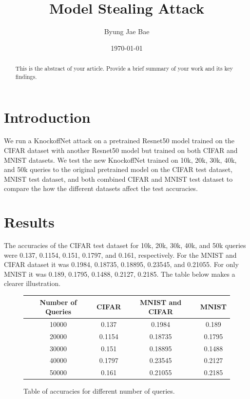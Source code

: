 \documentclass{article}
\title{Model Stealing Attack}
\author{Byung Jae Bae}
\date{\today}
\begin{document}
\maketitle

\begin{abstract}
    This is the abstract of your article. Provide a brief summary of your work and its key findings.
\end{abstract}

\section{Introduction}
We run a KnockoffNet attack on a pretrained Resnet50 model trained on the CIFAR dataset with another Resnet50 model but trained on both 
CIFAR and MNIST datasets. We test the new KnockoffNet trained on 10k, 20k, 30k, 40k, and 50k queries to the original pretrained model on the 
CIFAR test dataset, MNIST test dataset, and both combined CIFAR and MNIST test dataset to compare the how the different datasets affect the test accuracies.

\section{Results}
The accuracies of the CIFAR test dataset for 10k, 20k, 30k, 40k, and 50k queries were 0.137, 0.1154, 0.151, 0.1797, and 0.161, respectively.
For the MNIST and CIFAR dataset it was 0.1984, 0.18735, 0.18895, 0.23545, and 0.21055.
For only MNIST it was 0.189, 0.1795, 0.1488, 0.2127, 0.2185. The table below makes a clearer illustration.

\begin{figure}
    \begin{center}
        \begin{tabular}{|c | c c c|} 
        \hline
        Number of Queries & CIFAR & MNIST and CIFAR & MNIST \\ [0.5ex] 
        \hline
        10000 & 0.137 & 0.1984 & 0.189 \\ 
        \hline
        20000 & 0.1154 & 0.18735 & 0.1795 \\
        \hline
        30000 & 0.151 & 0.18895 & 0.1488 \\
        \hline
        40000 & 0.1797 & 0.23545 & 0.2127 \\
        \hline
        50000 & 0.161 & 0.21055 & 0.2185 \\ [1ex] 
        \hline
        \end{tabular}
    \end{center}
    \caption{Table of accuracies for different number of queries.}
    \label{fig:table1}
\end{figure}
\end{document}

